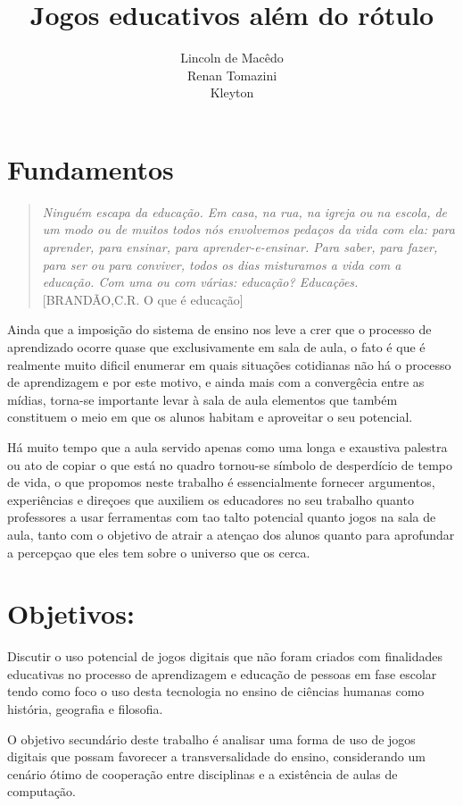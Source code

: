 \documentclass[10pt,a4paper]{article}
\author{Lincoln de Macêdo\\
		Renan Tomazini\\
		Kleyton}
\title{Jogos educativos além do rótulo}
\begin{document}
	
	\maketitle
	
	\section*{Fundamentos}
	
	\begin{quotation}
		\textit{Ninguém escapa da educação. Em casa, na rua, na igreja ou na escola, de um modo ou de muitos todos nós envolvemos pedaços da vida com ela: para aprender, para ensinar, para aprender-e-ensinar. Para saber, para fazer, para ser ou para conviver, todos os dias misturamos a vida com a educação. Com uma ou com várias: educação? Educações.} [BRANDÃO,C.R. O que é educação]
	\end{quotation}
	
	Ainda que a imposição do sistema de ensino nos leve a crer que o processo de aprendizado ocorre quase que exclusivamente em sala de aula, o fato é que é realmente muito dificil enumerar em quais situações cotidianas não há o processo de aprendizagem e por este motivo, e ainda mais com a convergêcia entre as mídias, torna-se importante levar à sala de aula elementos que também constituem o meio em que os alunos habitam e aproveitar o seu potencial.
	
	Há muito tempo que a aula servido apenas como uma longa e exaustiva palestra ou ato de copiar o que está no quadro tornou-se símbolo de desperdício de tempo de vida, o que propomos neste trabalho é essencialmente fornecer argumentos, experiências e direçoes que auxiliem os educadores no seu trabalho quanto professores a usar ferramentas com tao talto potencial quanto jogos na sala de aula, tanto com o objetivo de atrair a atençao dos alunos quanto para aprofundar a percepçao que eles tem sobre o universo que os cerca.
	
	\section*{Objetivos:}
	Discutir o uso potencial de jogos digitais que não foram criados com finalidades educativas no processo de aprendizagem e educação de pessoas em fase escolar tendo como foco o uso desta tecnologia no ensino de ciências humanas como história, geografia e filosofia.
	
	O objetivo secundário deste trabalho é analisar uma forma de uso de jogos digitais que possam favorecer a transversalidade do ensino, considerando um cenário ótimo de cooperação entre disciplinas e a existência de aulas de computação.
	
\end{document}
